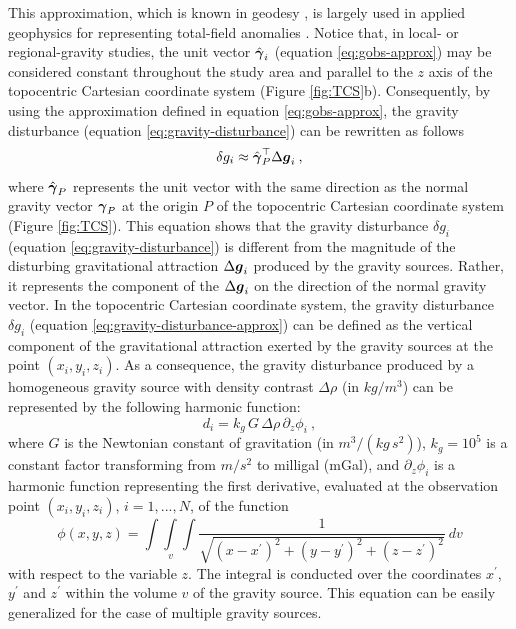 \documentclass[extra]{gji}
\begin{document}
This approximation, which is known in geodesy \citep[e.g.,][]{sanso_sideris2013},
is largely used in applied geophysics for representing
total-field anomalies \citep[e.g.,][]{blakely1996}.
Notice that, in local- or regional-gravity studies, the unit
vector $\hat{\mitbf{\gamma}}_{i}$ (equation \ref{eq:gobs-approx}) 
may be considered constant throughout the study area and 
parallel to the $z$ axis of the topocentric Cartesian coordinate 
system (Figure \ref{fig:TCS}b).
Consequently, by using the approximation defined in equation 
\ref{eq:gobs-approx}, the gravity disturbance 
(equation \ref{eq:gravity-disturbance}) can be rewritten as 
follows 
\begin{equation}
\delta g_{i} \approx \hat{\mitbf{\gamma}}_{P}^{\top} \Delta \mitbf{g}_{i} \: ,
\label{eq:gravity-disturbance-approx}
\end{equation}
where $\hat{\mitbf{\gamma}}_{P}$ represents the unit vector with
the same direction as the normal gravity vector $\mitbf{\gamma}_{P}$
at the origin $P$ of the topocentric Cartesian coordinate system
(Figure \ref{fig:TCS}).
This equation shows that the gravity disturbance $\delta g_{i}$ (equation \ref{eq:gravity-disturbance}) is different from the magnitude
of the disturbing gravitational attraction $\Delta \mitbf{g}_{i}$
produced by the gravity sources. Rather, it represents the 
component of the $\Delta \mitbf{g}_{i}$ on the direction of the normal
gravity vector. In the topocentric Cartesian coordinate system,
the gravity disturbance $\delta g_{i}$ (equation \ref{eq:gravity-disturbance-approx})
can be defined as the vertical component of the gravitational attraction exerted by
the gravity sources at the point $(x_{i}, y_{i}, z_{i})$.
As a consequence, the gravity disturbance produced by
a homogeneous gravity source with density contrast $\Delta\rho$
(in $kg / m^{3}$) can be represented by the following harmonic function:
\begin{equation}
d_{i} = k_{g} \, G \, \Delta\rho \, \partial_{z} \phi_{i} \: ,
\label{eq:gz-local}
\end{equation}
where $G$ is the Newtonian constant of gravitation
(in $m^{3} / (kg \, s^{2})$),
$k_{g} = 10^{5}$ is a constant factor
transforming from $m/s^{2}$ to milligal (mGal),
and $\partial_{z} \phi_{i}$ is a harmonic function representing the first 
derivative, evaluated at the observation point $(x_{i},y_{i},z_{i})$, 
$i = 1, ..., N$, of the function 
\begin{equation}
\phi(x,y,z) = \int\int\limits_{v}\int \frac{1}{\sqrt{(x - x^{\prime})^{2} + 
(y - y^{\prime})^{2} + (z - z^{\prime})^{2}}} \: dv
\label{eq:phi}
\end{equation}
with respect to the variable $z$. The 
integral is conducted over the coordinates $x^{\prime}$, $y^{\prime}$ 
and $z^{\prime}$ within the volume $v$ of the gravity source.
This equation can be easily generalized for the case
of multiple gravity sources.
\end{document}
